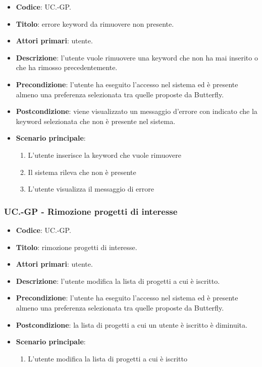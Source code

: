 	\begin{itemize}
		\item \textbf{Codice}: UC\theuccount.\thesubuccount-GP.
		\item \textbf{Titolo}: errore keyword da rimuovere non presente.
		\item \textbf{Attori primari}: utente.
		\item \textbf{Descrizione}: l'utente vuole rimuovere una keyword che non ha mai inserito o che ha rimosso precedentemente.
		\item \textbf{Precondizione}: l’utente ha eseguito l'accesso nel sistema ed è presente almeno
        una preferenza selezionata tra quelle proposte da Butterfly.
		\item \textbf{Postcondizione}: viene visualizzato un messaggio d'errore con indicato che la keyword	selezionata che non è presente nel sistema.
		\item \textbf{Scenario principale}:
		\begin{enumerate}
			\item L'utente inserisce la keyword che vuole rimuovere
			\item Il sistema rileva che non è presente
			\item L'utente visualizza il messaggio di errore
		\end{enumerate}
	\end{itemize}

    \subsubsection{UC\theuccount.\thesubuccount-GP - Rimozione progetti di interesse}
    
    \begin{itemize}
        \item \textbf{Codice}: UC\theuccount.\thesubuccount-GP.
        \item \textbf{Titolo}: rimozione progetti di interesse.
        \item \textbf{Attori primari}: utente.
        \item \textbf{Descrizione}: l'utente modifica la lista di progetti a cui è iscritto.
        \item \textbf{Precondizione}: l’utente ha eseguito l'accesso nel sistema ed è presente almeno
        una preferenza selezionata tra quelle proposte da Butterfly.
        \item \textbf{Postcondizione}: la lista di progetti a cui un utente è iscritto è diminuita.
        \item \textbf{Scenario principale}:
        \begin{enumerate}
            \item L'utente modifica la lista di progetti a cui è iscritto
        \end{enumerate}
    \end{itemize}
    
